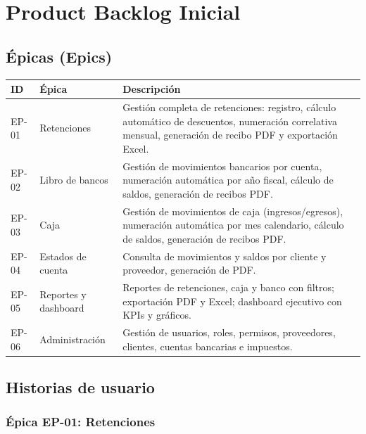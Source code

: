\documentclass[stu]{apa7}
\begin{document}
\newpage

\section{Product Backlog Inicial}

\subsection{Épicas (Epics)}

\begin{longtable}{|C{2cm}|L{5cm}|L{7cm}|}
\hline
{}
\textbf{ID} & \textbf{Épica} & \textbf{Descripción} \\
\hline
\endhead
EP-01 & Retenciones & Gestión completa de retenciones: registro, cálculo automático de descuentos, numeración correlativa mensual, generación de recibo PDF y exportación Excel. \\
\hline
EP-02 & Libro de bancos & Gestión de movimientos bancarios por cuenta, numeración automática por año fiscal, cálculo de saldos, generación de recibos PDF. \\
\hline
EP-03 & Caja & Gestión de movimientos de caja (ingresos/egresos), numeración automática por mes calendario, cálculo de saldos, generación de recibos PDF. \\
\hline
EP-04 & Estados de cuenta & Consulta de movimientos y saldos por cliente y proveedor, generación de PDF. \\
\hline
EP-05 & Reportes y dashboard & Reportes de retenciones, caja y banco con filtros; exportación PDF y Excel; dashboard ejecutivo con KPIs y gráficos. \\
\hline
EP-06 & Administración & Gestión de usuarios, roles, permisos, proveedores, clientes, cuentas bancarias e impuestos. \\
\hline
\end{longtable}

\newpage

\subsection{Historias de usuario}

\subsubsection{Épica EP-01: Retenciones}
\end{document}
